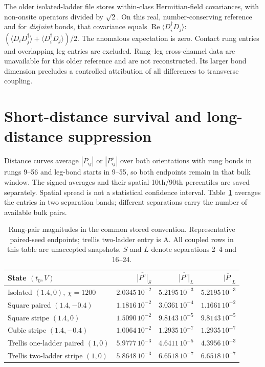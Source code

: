 \documentclass[11pt,letterpaper]{article}
\newcommand{\pc}{P^{\mathrm c}}
\begin{document}
The older isolated-ladder file stores within-class Hermitian-field covariances,
with non-onsite operators divided by $\sqrt2$. On this real,
number-conserving reference and for \emph{disjoint} bonds, that covariance
equals $\operatorname{Re}\langle D_i^\dagger D_j\rangle$:
$(\langle D_iD_j^\dagger\rangle+\langle D_i^\dagger D_j\rangle)/2$.
The anomalous expectation is zero. Contact rung entries and overlapping
leg entries are excluded. Rung--leg cross-channel data are unavailable for
this older reference and are not reconstructed. Its larger bond dimension
precludes a controlled attribution of all differences to transverse coupling.

\section{Short-distance survival and long-distance suppression}
Distance curves average $|P_{ij}|$ or $|\pc_{ij}|$ over both orientations
with rung bonds in rungs 9--56 and leg-bond starts in 9--55, so both endpoints
remain in that bulk window. The signed averages and their spatial 10th/90th percentiles are
saved separately. Spatial spread is not a statistical confidence interval.
Table~\ref{tab:strength} averages the entries in two separation bands;
different separations carry the number of available bulk pairs.

\begin{table}[htbp]\centering\small
\caption{Rung-pair magnitudes in the common stored convention. Representative
paired-seed endpoints; trellis two-ladder entry is A. All coupled rows in this
table are unaccepted snapshots. $S$ and $L$ denote separations 2--4 and 16--24.}
\label{tab:strength}
\begin{tabular}{lrrr}\toprule
State $(t_0,V)$ & $\overline{|\pc|}_S$ & $\overline{|\pc|}_L$ & $\overline{|P|}_L$\\\midrule
Isolated $(1.4,0)$, $\chi=1200$ & $2.0345\,10^{-2}$ & $5.2195\,10^{-3}$ & $5.2195\,10^{-3}$\\
Square paired $(1.4,-0.4)$ & $1.1816\,10^{-2}$ & $3.0361\,10^{-4}$ & $1.1661\,10^{-2}$\\
Square stripe $(1.4,0)$ & $1.5090\,10^{-2}$ & $9.8143\,10^{-5}$ & $9.8143\,10^{-5}$\\
Cubic stripe $(1.4,-0.4)$ & $1.0064\,10^{-2}$ & $1.2935\,10^{-7}$ & $1.2935\,10^{-7}$\\
Trellis one-ladder paired $(1,0)$ & $5.9777\,10^{-3}$ & $4.6411\,10^{-5}$ & $4.3956\,10^{-3}$\\
Trellis two-ladder stripe $(1,0)$ & $5.8648\,10^{-3}$ & $6.6518\,10^{-7}$ & $6.6518\,10^{-7}$\\\bottomrule
\end{tabular}
\end{table}
\end{document}
